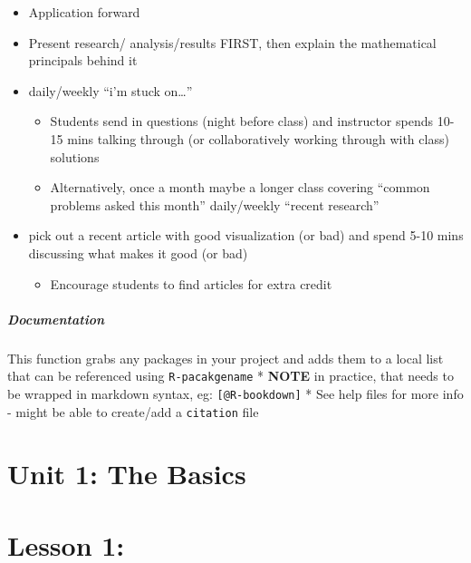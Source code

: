 \documentclass[
]{book}
\providecommand{\tightlist}{%
  \setlength{\itemsep}{0pt}\setlength{\parskip}{0pt}}
\begin{document}
\begin{itemize}
\tightlist
\item
  Application forward
\item
  Present research/ analysis/results FIRST, then explain the mathematical principals behind it
\item
  daily/weekly ``i'm stuck on\ldots{}''

  \begin{itemize}
  \tightlist
  \item
    Students send in questions (night before class) and instructor spends 10-15 mins talking through (or collaboratively working through with class) solutions
  \item
    Alternatively, once a month maybe a longer class covering ``common problems asked this month''
    daily/weekly ``recent research''
  \end{itemize}
\item
  pick out a recent article with good visualization (or bad) and spend 5-10 mins discussing what makes it good (or bad)

  \begin{itemize}
  \tightlist
  \item
    Encourage students to find articles for extra credit
  \end{itemize}
\end{itemize}

\hypertarget{documentation}{%
\paragraph*{Documentation}\label{documentation}}

This function grabs any packages in your project and adds them to a local list that can be referenced using \texttt{R-pacakgename}
* \textbf{NOTE} in practice, that needs to be wrapped in markdown syntax, eg:
\texttt{{[}@R-bookdown{]}}
* See help files for more info - might be able to create/add a \texttt{citation} file

\hypertarget{unit1}{%
\chapter{Unit 1: The Basics}\label{unit1}}

\hypertarget{lesson-1}{%
\chapter{Lesson 1:}\label{lesson-1}}
\end{document}
